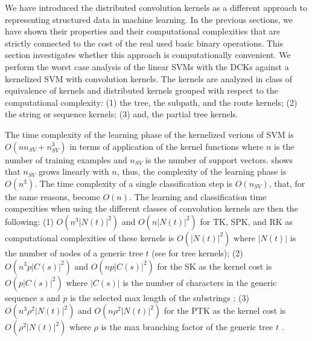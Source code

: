\documentclass[twoside,11pt]{article}
\def\mynodes#1{N(#1)}
\def\mychar#1{C(#1)}
\def\nnodes#1{|\mynodes{#1}|}
\def\nchar#1{|\mychar{#1}|}
\newcounter{properties}
\def\mysecondremove#1{}
\def\mysecondinsert#1{#1}
\begin{document}
We have introduced the distributed convolution kernels as a different approach to representing structured data in machine learning. In the previous sections, we have shown their properties and their computational complexities that are strictly connected to the cost of the real used basic \mysecondinsert{binary}\mysecondremove{composition} operations. This section investigates whether this approach is computationally convenient. We perform the worst case analysis of the linear SVMs \cite{Joachims:2006:TLS:1150402.1150429,DBLP:journals/mp/Shalev-ShwartzSSC11} with the DCKs against a kernelized SVM with convolution kernels. 
The kernels are analyzed in class of equivalence of kernels and distributed kernels grouped with respect to the computational complexity: (1) the tree, the subpath, and the route kernels; (2) the string or sequence kernels; (3) and, the partial tree kernels.  

The time complexity of the learning phase of the kernelized verions of SVM is $O(n n_{SV}+ n_{SV}^3)$ in terms of application of the kernel functions where $n$ is the number of training examples and $n_{SV}$ is the number of support vectors. \cite{NIPS2003_LT01} shows that $n_{SV}$ grows linearly with $n$, thus, the complexity of the learning phase is $O(n^3)$. The time complexity of a single classification step is $O(n_{SV})$, that, for the same reasons, become $O(n)$. The learning and classification time compexities when using the different classes of convolution kernels are then the following: (1) $O(n^3\nnodes{t}^2)$ and $O(n\nnodes{t}^2)$ for TK, SPK, and RK as computational complexities of these kernels is $O(\nnodes{t}^2)$ where $\nnodes{t}$ is the number of nodes of a generic tree $t$ (see \cite{Collins2002} for tree kernels); (2) $O(n^3p\nchar{s}^2)$  and $O(np\nchar{s}^2)$ for the SK as the kernel cost is $O(p\nchar{s}^2)$ where $\nchar{s}$ is the number of characters in the generic sequence $s$ 
and $p$ is the selected max length of the substrings \cite{Lodhi:2002:TCU:944790.944799}; (3) $O(n^3\rho^2\nnodes{t}^2)$ and $O(n\rho^2\nnodes{t}^2)$  for the PTK as the kernel cost is $O(\rho^2\nnodes{t}^2)$ where $\rho$ is the max branching factor of the generic tree $t$ \cite{Moschitti2006b}.
\end{document}
